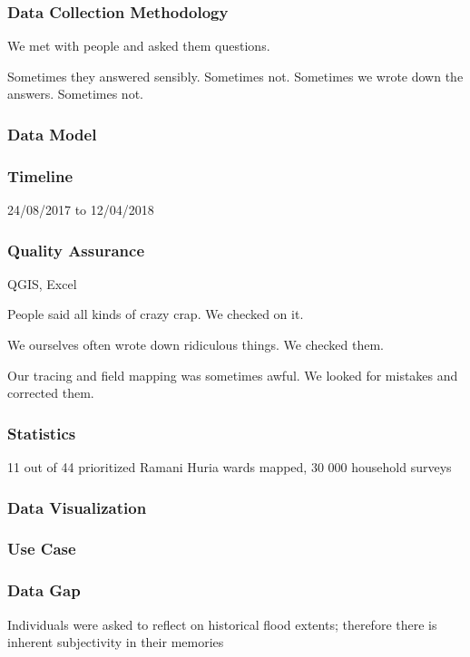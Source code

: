 \documentclass[a4paper,12pt,twoside]{article}
\begin{document}
\subsubsection{Data Collection Methodology}

We met with people and asked them questions.

Sometimes they answered sensibly. Sometimes not. Sometimes we wrote down the answers. Sometimes not.

\subsubsection{Data Model}

\subsubsection{Timeline}
24/08/2017 to 12/04/2018

\subsubsection{Quality Assurance}
QGIS, Excel

\bigskip
People said all kinds of crazy crap. We checked on it.

We ourselves often wrote down ridiculous things. We checked them.

Our tracing and field mapping was sometimes awful. We looked for mistakes and corrected them.

\subsubsection{Statistics}
11 out of 44 prioritized Ramani Huria wards mapped, 30 000 household surveys

\subsubsection{Data Visualization}

\subsubsection{Use Case}

\subsubsection{Data Gap}
Individuals were asked to reflect on historical flood extents; therefore there is inherent subjectivity in their memories
\end{document}
